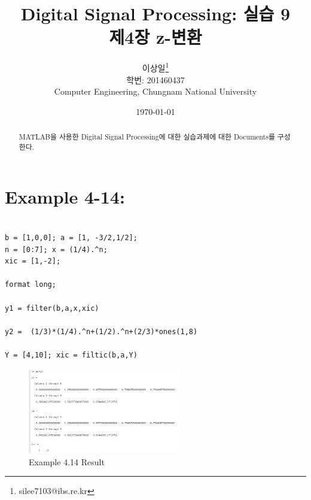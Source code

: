 \documentclass[11pt
  , a4paper
  , article
  , oneside
]{memoir}
\begin{document}
\newcommand{\technumber}{
  Digital Signal Processing using MATLAB\\
  Document 1: 2016-03-26}
\title{\textbf{Digital Signal Processing: 실습 9 \\
		제4장 z-변환 \\}}

\author{이상일\thanks{silee7103@ibs.re.kr} \\

  학번: 201460437\\
  Computer Engineering, Chungnam National University 
}
\date{\today}

\renewcommand{\maketitlehooka}{\begin{flushright}\textsf{\technumber}\end{flushright}}

\maketitle

\begin{abstract}
MATLAB을 사용한 Digital Signal Processing에 대한 실습과제에 대한 Documents를 구성한다.
\end{abstract}

\chapter{Example 4-14:}

\begin{lstlisting}[style=termstyle]
%Example 4.14

b = [1,0,0]; a = [1, -3/2,1/2];
n = [0:7]; x = (1/4).^n; 
xic = [1,-2];

format long;

y1 = filter(b,a,x,xic)

y2 =  (1/3)*(1/4).^n+(1/2).^n+(2/3)*ones(1,8)

Y = [4,10]; xic = filtic(b,a,Y)
\end{lstlisting}

\begin{figure}[h!]
	\centering
	\includegraphics[width=0.6\textwidth,height=0.4\textwidth]{./images/ex414.png}
	\caption{Example 4.14 Result}
	\label{fig:Example 4.14 Result}
\end{figure}
\end{document}
